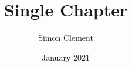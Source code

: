 \documentclass{article}
\title{Single Chapter}
\author{Simon Clement}
\date{January 2021}
\begin{document}
\def\cal{\mathscr}

\end{document}
